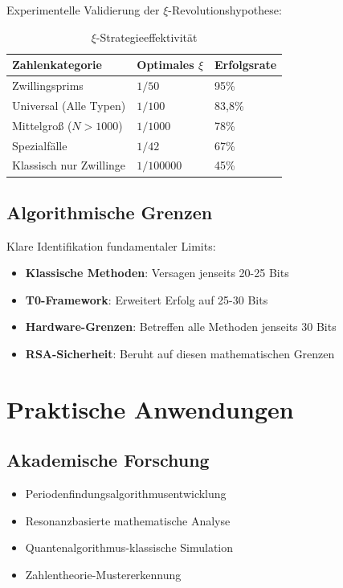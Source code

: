 	Experimentelle Validierung der $\xi$-Revolutionshypothese:
	
	\begin{table}[H]
		\centering
		\caption{$\xi$-Strategieeffektivität}
		\begin{tabular}{lll}
			\toprule
			\textbf{Zahlenkategorie} & \textbf{Optimales $\xi$} & \textbf{Erfolgsrate} \\
			\midrule
			Zwillingsprims & $1/50$ & 95\% \\
			Universal (Alle Typen) & $1/100$ & 83,8\% \\
			Mittelgroß ($N > 1000$) & $1/1000$ & 78\% \\
			Spezialfälle & $1/42$ & 67\% \\
			Klassisch nur Zwillinge & $1/100000$ & 45\% \\
			\bottomrule
		\end{tabular}
	\end{table}
	
	\subsection{Algorithmische Grenzen}
	
	Klare Identifikation fundamentaler Limits:
	\begin{itemize}
		\item \textbf{Klassische Methoden}: Versagen jenseits 20-25 Bits
		\item \textbf{T0-Framework}: Erweitert Erfolg auf 25-30 Bits
		\item \textbf{Hardware-Grenzen}: Betreffen alle Methoden jenseits 30 Bits
		\item \textbf{RSA-Sicherheit}: Beruht auf diesen mathematischen Grenzen
	\end{itemize}
	
	\section{Praktische Anwendungen}
	
	\subsection{Akademische Forschung}
	\begin{itemize}
		\item Periodenfindungsalgorithmusentwicklung
		\item Resonanzbasierte mathematische Analyse
		\item Quantenalgorithmus-klassische Simulation
		\item Zahlentheorie-Mustererkennung
	\end{itemize}
	
